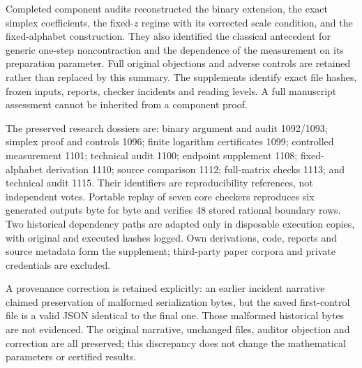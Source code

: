 \documentclass[11pt]{article}
\theoremstyle{remark}\newtheorem{remark}[theorem]{Remark}
\begin{document}
Completed component audits reconstructed the binary extension, the exact simplex coefficients, the fixed-$z$ regime with its corrected scale condition, and the fixed-alphabet construction. They also identified the classical antecedent for generic one-step noncontraction and the dependence of the measurement on its preparation parameter. Full original objections and adverse controls are retained rather than replaced by this summary. The supplements identify exact file hashes, frozen inputs, reports, checker incidents and reading levels. A full manuscript assessment cannot be inherited from a component proof.

The preserved research dossiers are: binary argument and audit 1092/1093; simplex proof and controls 1096; finite logarithm certificates 1099; controlled measurement 1101; technical audit 1100; endpoint supplement 1108; fixed-alphabet derivation 1110; source comparison 1112; full-matrix checks 1113; and technical audit 1115. Their identifiers are reproducibility references, not independent votes. Portable replay of seven core checkers reproduces six generated outputs byte for byte and verifies 48 stored rational boundary rows. Two historical dependency paths are adapted only in disposable execution copies, with original and executed hashes logged. Own derivations, code, reports and source metadata form the supplement; third-party paper corpora and private credentials are excluded.

A provenance correction is retained explicitly: an earlier incident narrative claimed preservation of malformed serialization bytes, but the saved first-control file is a valid JSON identical to the final one. Those malformed historical bytes are not evidenced. The original narrative, unchanged files, auditor objection and correction are all preserved; this discrepancy does not change the mathematical parameters or certified results.
\end{document}
